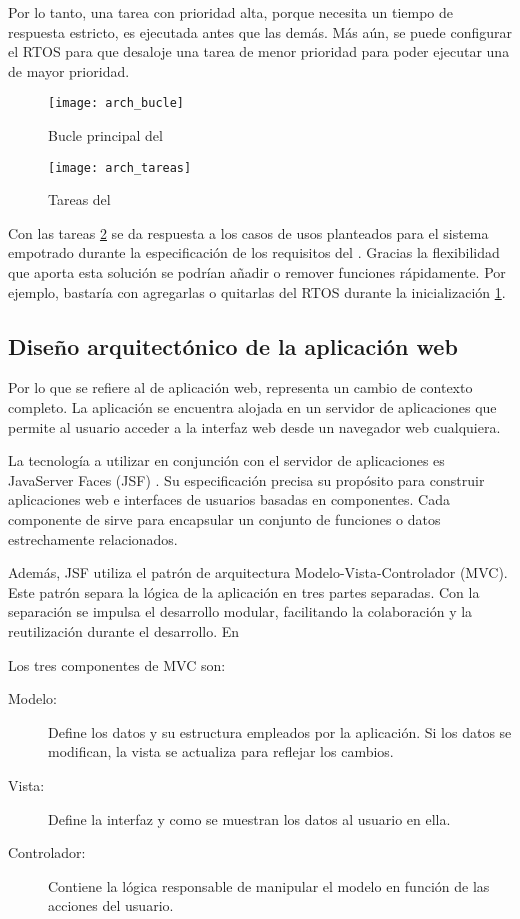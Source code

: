 Por lo tanto, una tarea con prioridad alta, porque necesita un tiempo
de respuesta estricto, es ejecutada antes que las demás. Más aún, se puede
configurar el RTOS para que desaloje una tarea de menor prioridad para poder
ejecutar una de mayor prioridad.

\begin{figure}[!h]
  \centering
  \texttt{[image: arch\_bucle]}
  \caption{Bucle principal del \sw{}} \label{fig:bucle}
\end{figure}

\begin{figure}[!h]
  \centering
  \texttt{[image: arch\_tareas]}
  \caption{Tareas del \sw{}} \label{fig:tareas}
\end{figure}

Con las tareas \ref{fig:tareas} se da respuesta a los casos de usos planteados
para el sistema empotrado durante la especificación de los requisitos del \sw{}.
Gracias la flexibilidad que aporta esta solución se podrían añadir o remover
funciones rápidamente. Por ejemplo, bastaría con agregarlas o quitarlas del 
RTOS durante la inicialización \ref{fig:bucle}.

\subsection{Diseño arquitectónico de la aplicación web} \label{sec:arch-aw}
Por lo que se refiere al \sw{} de aplicación web, representa un cambio de
contexto completo. La aplicación se encuentra alojada en un servidor de
aplicaciones que permite al usuario acceder a la interfaz web desde un
navegador web cualquiera.

La tecnología a utilizar en conjunción con el servidor de aplicaciones es
JavaServer Faces (JSF) \cite{webpage:jsf}. Su especificación precisa su
propósito para construir aplicaciones web e interfaces de usuarios basadas
en componentes. Cada componente de \sw{} sirve para encapsular un conjunto
de funciones o datos estrechamente relacionados.

Además, JSF utiliza el patrón de arquitectura Modelo-Vista-Controlador (MVC).
Este patrón separa la lógica de la aplicación en tres partes separadas.
Con la separación se impulsa el desarrollo modular, facilitando la colaboración
y la reutilización durante el desarrollo. En 

Los tres componentes de MVC son:
\begin{description}
  \item[Modelo:] Define los datos y su estructura empleados por la aplicación.
  Si los datos se modifican, la vista se actualiza para reflejar los cambios.
  \item[Vista:] Define la interfaz y como se muestran los datos al usuario
  en ella.
  \item[Controlador:] Contiene la lógica responsable de manipular el modelo
  en función de las acciones del usuario.
\end{description}

